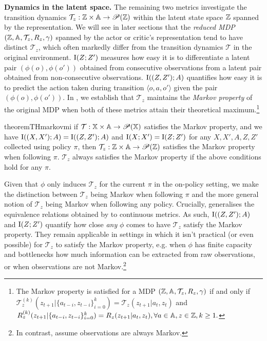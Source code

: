 \textbf{Dynamics in the latent space.} The remaining two metrics investigate the transition dynamics $\mathcal{T}_z : {\mathbb{Z}} \times {\mathbb{A}} \rightarrow \mathscr{P}({\mathbb{Z}})$ within the latent state space ${\mathbb{Z}}$ spanned by the representation. We will see in later sections that the \textit{reduced MDP} $({\mathbb{Z}},{\mathbb{A}},\mathcal{T}_z, R_z, \gamma)$ spanned by the actor or critic's representation tend to have distinct $\mathcal{T}_z$, which often markedly differ from the transition dynamics $\mathcal{T}$ in the original environment. $\text{I}(Z;Z')$ measures how easy it is to differentiate a latent pair $( \phi(o),\phi(o'))$ obtained from consecutive observations from a latent pair obtained from non-consecutive observations. $\text{I}((Z,Z');A)$ quantifies how easy it is to predict the action taken during transition $\langle o, a, o' \rangle$ given the pair $( \phi(o),\phi(o'))$. In , we establish that $\mathcal{T}_z$ maintains the \textit{Markov property} of the original MDP when both of these metrics attain their theoretical maximum.\footnote{The Markov property is satisfied for a MDP $({\mathbb{Z}},{\mathbb{A}},\mathcal{T}_z, R_z, \gamma)$ if and only if $\mathcal{T}_z^{(k)}(z_{t+1}|\{a_{t-i},z_{t-i}\}^k_{i=0})=\mathcal{T}_z(z_{t+1}|a_{t},z_{t})$ and $R_z^{(k)}(z_{t+1}|\{a_{t-i},z_{t-i}\}^k_{i=0})=R_z(z_{t+1}|a_{t},z_{t}), \forall a\in{\mathbb{A}}, z\in{\mathbb{Z}}, k \geq 1.$ 
 }
\begin{restatable}{theorem}{THmarkovmi}\label{c2:th:markov_mi}
 if $\mathcal{T} : {\mathbb{X}} \times {\mathbb{A}} \rightarrow \mathscr{P}({\mathbb{X}})$ satisfies the Markov property, and we have $\text{I}((X,X');A)=\text{I}((Z,Z');A)$ and $\text{I}(X;X')=\text{I}(Z;Z')$ for any $X,X',A,Z,Z'$ collected using policy $\pi$, then $\mathcal{T}_z : {\mathbb{Z}} \times {\mathbb{A}} \rightarrow \mathscr{P}({\mathbb{Z}})$ satisfies the Markov property when following $\pi$. $\mathcal{T}_z$ always satisfies the Markov property if the above conditions hold for any $\pi$.
\end{restatable}
Given that $\phi$ only induces $\mathcal{T}_z$ for the current $\pi$ in the on-policy setting, we make the distinction between $\mathcal{T}_z$ being Markov when following $\pi$ and the more general notion of $\mathcal{T}_z$ being Markov when following any policy. Crucially,  generalises the equivalence relations obtained by \citet{markov_z} to continuous metrics. As such, $\text{I}((Z,Z');A)$ and $\text{I}(Z;Z')$ quantify how close \textit{any} $\phi$ comes to have $\mathcal{T}_z$ satisfy the Markov property. They remain applicable in settings in which it isn't practical (or even possible) for $\mathcal{T}_z$ to satisfy the Markov property, e.g. when $\phi$ has finite capacity and bottlenecks how much information can be extracted from raw observations, or when observations are not Markov.\footnote{In contrast, \citet{markov_z} assume observations are always Markov.}  
%
